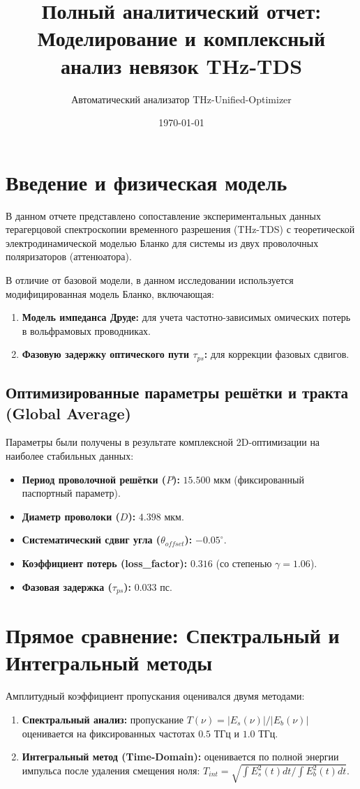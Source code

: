 \documentclass[12pt,a4paper]{article}
\title{Полный аналитический отчет: Моделирование и комплексный анализ невязок THz-TDS}
\author{Автоматический анализатор THz-Unified-Optimizer}
\date{\today}
\begin{document}
\maketitle

\tableofcontents
\newpage

\section{Введение и физическая модель}
В данном отчете представлено сопоставление экспериментальных данных терагерцовой спектроскопии временного разрешения (THz-TDS) с теоретической электродинамической моделью Бланко для системы из двух проволочных поляризаторов (аттенюатора).

В отличие от базовой модели, в данном исследовании используется модифицированная модель Бланко, включающая:
\begin{enumerate}
    \item \textbf{Модель импеданса Друде:} для учета частотно-зависимых омических потерь в вольфрамовых проводниках.
    \item \textbf{Фазовую задержку оптического пути $\tau_{ps}$:} для коррекции фазовых сдвигов.
\end{enumerate}

\subsection{Оптимизированные параметры решётки и тракта (Global Average)}
Параметры были получены в результате комплексной 2D-оптимизации на наиболее стабильных данных:
\begin{itemize}
    \item \textbf{Период проволочной решётки ($P$):} $15.500$ мкм (фиксированный паспортный параметр).
    \item \textbf{Диаметр проволоки ($D$):} $4.398$ мкм.
    \item \textbf{Систематический сдвиг угла ($\theta_{offset}$):} $-0.05^\circ$.
    \item \textbf{Коэффициент потерь (loss\_factor):} $0.316$ (со степенью $\gamma = 1.06$).
    \item \textbf{Фазовая задержка ($\tau_{ps}$):} $0.033$ пс.
\end{itemize}

\section{Прямое сравнение: Спектральный и Интегральный методы}
Амплитудный коэффициент пропускания оценивался двумя методами:
\begin{enumerate}
    \item \textbf{Спектральный анализ:} пропускание $T(\nu) = |E_s(\nu)| / |E_b(\nu)|$ оценивается на фиксированных частотах $0.5$ ТГц и $1.0$ ТГц.
    \item \textbf{Интегральный метод (Time-Domain):} оценивается по полной энергии импульса после удаления смещения ноля: $T_{int} = \sqrt{\int E_s^2(t) dt / \int E_b^2(t) dt}$.
\end{enumerate}
\end{document}
